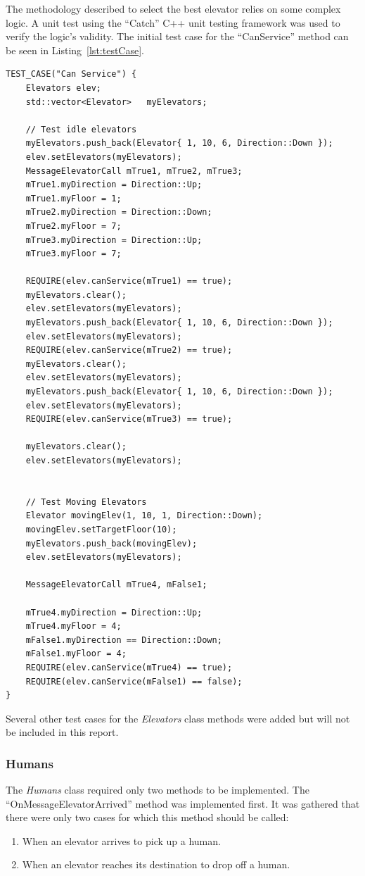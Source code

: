 \documentclass{article}
\begin{document}
The methodology described to select the best elevator relies on some complex logic. 
A unit test using the ``Catch'' C++ unit testing framework was used to verify the logic's validity.
The initial test case for the ``CanService'' method can be seen in Listing~\ref{lst:testCase}.
\begin{lstlisting}[float,caption={Can Service Test Case},xleftmargin=.15\textwidth,label={lst:testCase}]
TEST_CASE("Can Service") {
	Elevators elev;
	std::vector<Elevator>	myElevators;
	
	// Test idle elevators
	myElevators.push_back(Elevator{ 1, 10, 6, Direction::Down });
	elev.setElevators(myElevators);
	MessageElevatorCall mTrue1, mTrue2, mTrue3;
	mTrue1.myDirection = Direction::Up;
	mTrue1.myFloor = 1;
	mTrue2.myDirection = Direction::Down;
	mTrue2.myFloor = 7;
	mTrue3.myDirection = Direction::Up;
	mTrue3.myFloor = 7;
	
	REQUIRE(elev.canService(mTrue1) == true);
	myElevators.clear();
	elev.setElevators(myElevators);
	myElevators.push_back(Elevator{ 1, 10, 6, Direction::Down });
	elev.setElevators(myElevators);
	REQUIRE(elev.canService(mTrue2) == true);
	myElevators.clear();
	elev.setElevators(myElevators);
	myElevators.push_back(Elevator{ 1, 10, 6, Direction::Down });
	elev.setElevators(myElevators);
	REQUIRE(elev.canService(mTrue3) == true);
	
	myElevators.clear();
	elev.setElevators(myElevators);
	
	
	// Test Moving Elevators
	Elevator movingElev(1, 10, 1, Direction::Down);
	movingElev.setTargetFloor(10);
	myElevators.push_back(movingElev);
	elev.setElevators(myElevators);
	
	MessageElevatorCall mTrue4, mFalse1;
	
	mTrue4.myDirection = Direction::Up;
	mTrue4.myFloor = 4;
	mFalse1.myDirection == Direction::Down;
	mFalse1.myFloor = 4;
	REQUIRE(elev.canService(mTrue4) == true);
	REQUIRE(elev.canService(mFalse1) == false);
}
\end{lstlisting}
Several other test cases for the \textit{Elevators} class methods were added but will not be included in this report.

\subsubsection{Humans}
The \textit{Humans} class required only two methods to be implemented.
The ``OnMessageElevatorArrived'' method was implemented first.
It was gathered that there were only two cases for which this method should be called:
\begin{enumerate}
	\item When an elevator arrives to pick up a human.
	\item When an elevator reaches its destination to drop off a human.
\end{enumerate}
\end{document}

